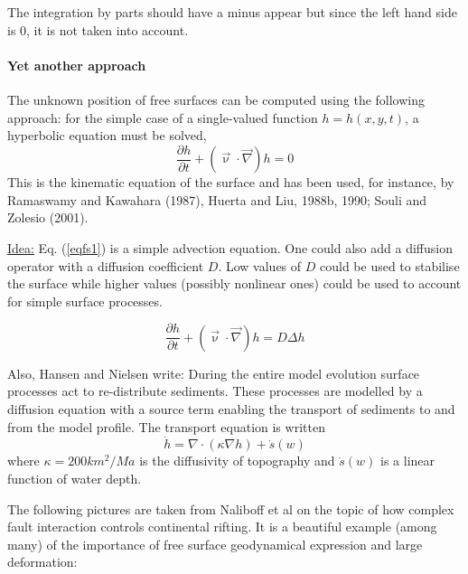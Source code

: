\begin{remark}
The integration by parts should have a minus appear but since the left hand side 
is 0, it is not taken into account. 
\end{remark}



\paragraph{Yet another approach \cite{dohp04}}
The unknown position of free surfaces can be computed using the following approach:
for the simple case of a single-valued function $h=h(x,y,t)$, a hyperbolic equation must be solved,
\begin{equation}
\frac{\partial h}{\partial t} + (\vec{ \upnu}\cdot \vec{ \nabla}) h = 0    \label{eqfs1}
\end{equation}
This is the kinematic equation of the surface and has been used, for instance, 
by Ramaswamy and Kawahara (1987), Huerta and Liu, 1988b, 1990; Souli and Zolesio (2001).





\underline{Idea:} Eq. (\ref{eqfs1}) is a simple advection equation. 
One could also add a diffusion operator with a diffusion coefficient $D$.
Low values of $D$ could be used to stabilise the surface while 
higher values (possibly nonlinear ones) could be used to account for simple 
surface processes. 

\begin{equation}
\frac{\partial h}{\partial t} + (\vec{\upnu}\cdot\vec{ \nabla}) h = D \Delta h  \label{eqfs2}
\end{equation}

Also, Hansen and Nielsen \cite{hanl00,hani03} write:
During the entire model evolution surface processes act to re-distribute sediments. 
These processes are modelled by a diffusion equation with a source term enabling the transport 
of sediments to and from the model profile. The transport equation is written
\[
\dot{h}=\nabla\cdot (\kappa \nabla h) + \dot{s}(w)
\]
where $\kappa=200 km^2/Ma$ is the diffusivity of topography and $\dot{s}(w)$ 
is a linear function of water depth. 



The following pictures are taken from Naliboff et al \cite{nabp17} on the topic 
of how complex fault interaction controls continental rifting. It is a beautiful
example (among many) of the importance of free surface geodynamical expression
and large deformation:

